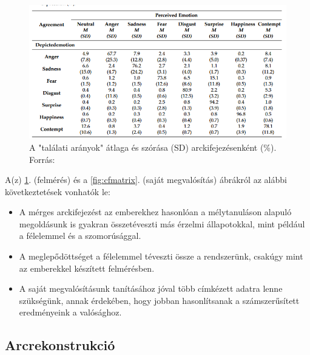 \documentclass[12pt,a4]{article}
\begin{document}
    
    
       
    
        \begin{figure}[h]	
    		\centering
    		\includegraphics[width=1\linewidth]{facerechuman-confmatrix.png}
            \caption{A "találati arányok" átlaga és szórása (SD) arckifejezésenként (\%). Forrás: \cite{facerecresult}}
            \label{fig:humanfacerecmatrix}
    	\end{figure}

        A(z) \ref{fig:humanfacerecmatrix}. (felmérés) és a \ref{fig:cfmatrix}. (saját megvalósítás) ábrákról az alábbi következtetések vonhatók le:

        \begin{itemize}
            \item A mérges arckifejezést az emberekhez hasonlóan a mélytanuláson alapuló megoldásunk is gyakran összetéveszti más érzelmi állapotokkal, mint például a félelemmel és a szomorúsággal.
            \item A meglepődöttséget a félelemmel téveszti össze a rendszerünk, csakúgy mint az emberekkel készített felmérésben.
            \item A saját megvalósításunk tanításához jóval több címkézett adatra lenne szükségünk, annak érdekében, hogy jobban hasonlítsanak a számszerűsített eredményeink a valósághoz.
        \end{itemize}

        \subsection{Arcrekonstrukció}
 	    

        
 
\end{document}
